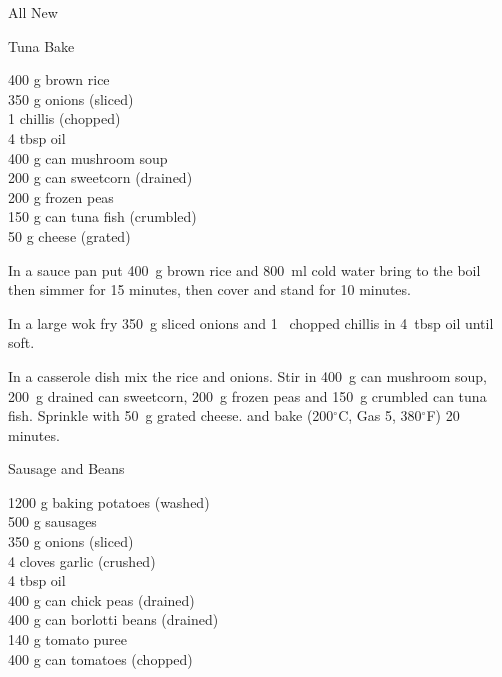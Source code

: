 \begin{menu}{All New}
    \begin{recipe}{2}{Tuna Bake}%
    
		\begin{ingredients}
		400 g brown rice  \\
	350 g onions (sliced) \\
	1  chillis (chopped) \\
	4 tbsp oil  \\
	400 g can mushroom soup  \\
	200 g can sweetcorn (drained) \\
	200 g frozen peas  \\
	150 g can tuna fish (crumbled) \\
	50 g cheese (grated) \\
	
		\end{ingredients}
	
    \begin{instructions}
    \item 
      In a
      sauce pan
      put
      400~g  brown rice
      and
      800~ml  cold water
      bring to the boil then simmer for 15 minutes,
      then cover and stand for 10 minutes.
    \item 
        In a large wok fry
        350~g sliced onions
        and
        1~ chopped chillis
        in
        4~tbsp  oil
        until soft.
      \item 
        In a casserole dish mix
        the rice and onions.
        Stir in
        400~g  can mushroom soup,
        200~g drained can sweetcorn,
        200~g  frozen peas
        and
        150~g crumbled can tuna fish.
        Sprinkle with
        50~g grated cheese.
        and
        bake 
      (200$^{\circ}$C, Gas 5, 380$^{\circ}$F)
     20 minutes.
      
    \end{instructions}
    \end{recipe}%
  
    \begin{recipe}{2}{Sausage and Beans}%
    
		\begin{ingredients}
		1200 g baking potatoes (washed) \\
	500 g sausages  \\
	350 g onions (sliced) \\
	4 cloves garlic (crushed) \\
	4 tbsp oil  \\
	400 g can chick peas (drained) \\
	400 g can borlotti beans (drained) \\
	140 g tomato puree  \\
	400 g can tomatoes (chopped) \\
	

\end{ingredients}
\end{recipe}
\end{menu}
